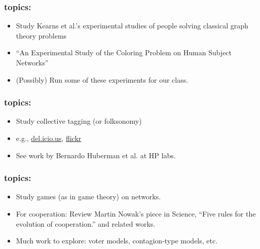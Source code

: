   \begin{frame}
    \frametitle{topics:}
      
    \begin{block}{}
    \begin{itemize}
    \item <1->
      Study Kearns et al.'s experimental studies
      of people solving classical graph theory problems\cite{kearns2006a}
    \item <1->
      ``An Experimental Study of the Coloring Problem on Human Subject Networks''
    \item <2-> (Possibly) Run some of these experiments for our class.
    \end{itemize}
    \end{block}

  \end{frame}





\begin{frame}
  \frametitle{topics:}

  \begin{block}{}
  \begin{itemize}
  \item<1-> 
    Study \alert{collective tagging} (or folksonomy)
  \item<1-> 
    e.g., \href{http://del.icio.us}{del.icio.us}, \href{http://www.flickr.com}{flickr}
  \item<1-> 
    See work by Bernardo Huberman et al. at HP labs.
  \end{itemize}
  \end{block}

\end{frame}


\begin{frame}
  \frametitle{topics:}

  \begin{block}{}
  \begin{itemize}
  \item<1->
    Study games (as in game theory) on
    networks.  
  \item<1->
    For cooperation: Review Martin Nowak's piece in Science,
    ``Five rules for the evolution of cooperation.''\cite{nowak2006a}
    and related works.
  \item<1-> Much work to explore: voter models, contagion-type models, etc.
  \end{itemize}
  \end{block}

\end{frame}

